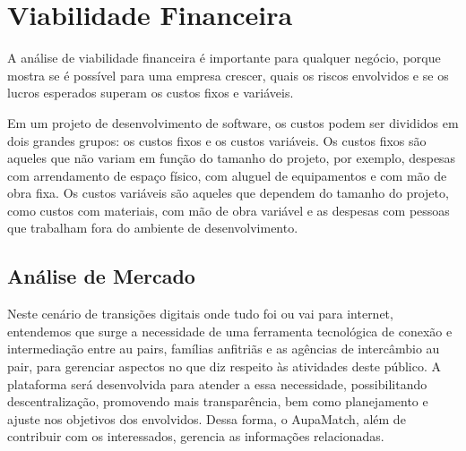 \section{Viabilidade Financeira}
A análise de viabilidade financeira é importante para qualquer negócio, porque mostra se é possível para uma empresa crescer, quais os riscos envolvidos e se os lucros esperados superam os custos fixos e variáveis.

Em um projeto de desenvolvimento de software, os custos podem ser divididos em dois grandes grupos: os custos fixos e os custos variáveis. Os custos fixos são aqueles que não variam em função do tamanho do projeto, por exemplo, despesas com arrendamento de espaço físico, com aluguel de equipamentos e com mão de obra fixa. Os custos variáveis são aqueles que dependem do tamanho do projeto, como custos com materiais, com mão de obra variável e as despesas com pessoas que trabalham fora do ambiente de desenvolvimento.

\subsection{Análise de Mercado}

Neste cenário de transições digitais onde tudo foi ou vai para internet, entendemos que surge a necessidade de uma ferramenta tecnológica de conexão e intermediação entre au pairs, famílias anfitriãs e as agências de intercâmbio au pair, para gerenciar aspectos no que diz respeito às atividades deste público. A plataforma será desenvolvida para atender a essa necessidade, possibilitando descentralização, promovendo mais transparência, bem como planejamento e ajuste nos objetivos dos envolvidos. 
Dessa forma, o AupaMatch, além de contribuir com os interessados, gerencia as informações relacionadas.